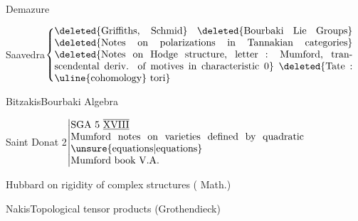 








Demazure\qquad {}

Saavedra\quad \(\left\{\vcenter{\hbox{\begin{minipage}{.87\linewidth}
\deleted{Griffiths, Schmid}

\deleted{Bourbaki Lie Groups}

\deleted{Notes on polarizations in Tannakian categories}

\deleted{Notes on Hodge structure, letter : Mumford, transcendental deriv. of motives in characteristic 0}

\deleted{Tate : \uline{cohomology} tori}
\end{minipage}}}\right.\)

Bitzakis\qquad Bourbaki Algebra





Saint Donat 2\qquad \(\left\vert\begin{array}{@{}p{.68\linewidth}@{}}SGA 5 $\overline{\underline{\mathrm{XVIII}}}$\\Mumford notes on varieties defined by quadratic \unsure{equations|equations}\\Mumford book V.A.\end{array}\right.\)

Hubbard\qquad {} on rigidity of complex structures ( Math.)

Nakis\qquad Topological tensor products (Grothendieck)

\clearpage
